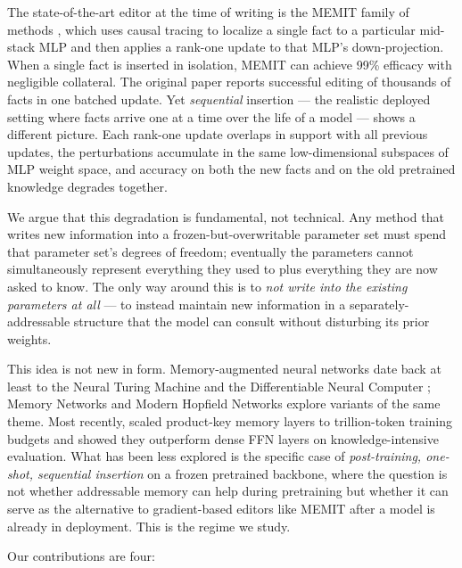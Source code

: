 \documentclass[11pt,a4paper]{article}
\begin{document}
The state-of-the-art editor at the time of writing is the MEMIT family of
methods \citep{meng2022rome,meng2022memit}, which uses causal tracing to
localize a single fact to a particular mid-stack MLP and then applies a
rank-one update to that MLP's down-projection. When a single fact is
inserted in isolation, MEMIT can achieve 99\% efficacy with negligible
collateral. The original paper reports successful editing of thousands of
facts in one batched update. Yet \emph{sequential} insertion --- the
realistic deployed setting where facts arrive one at a time over the life
of a model --- shows a different picture. Each rank-one update overlaps
in support with all previous updates, the perturbations accumulate in the
same low-dimensional subspaces of MLP weight space, and accuracy on both
the new facts and on the old pretrained knowledge degrades together.

We argue that this degradation is fundamental, not technical. Any method
that writes new information into a frozen-but-overwritable parameter set
must spend that parameter set's degrees of freedom; eventually the
parameters cannot simultaneously represent everything they used to plus
everything they are now asked to know. The only way around this is to
\emph{not write into the existing parameters at all} --- to instead
maintain new information in a separately-addressable structure that the
model can consult without disturbing its prior weights.

This idea is not new in form. Memory-augmented neural networks date back
at least to the Neural Turing Machine \citep{graves2014ntm} and the
Differentiable Neural Computer \citep{graves2016dnc}; Memory Networks
\citep{weston2015memnets} and Modern Hopfield Networks
\citep{ramsauer2020modern} explore variants of the same theme. Most
recently, \citet{berges2024memory} scaled product-key memory layers to
trillion-token training budgets and showed they outperform dense FFN
layers on knowledge-intensive evaluation. What has been less explored is
the specific case of \emph{post-training, one-shot, sequential insertion}
on a frozen pretrained backbone, where the question is not whether
addressable memory can help during pretraining but whether it can serve as
the alternative to gradient-based editors like MEMIT after a model is
already in deployment. This is the regime we study.

Our contributions are four:
\end{document}
